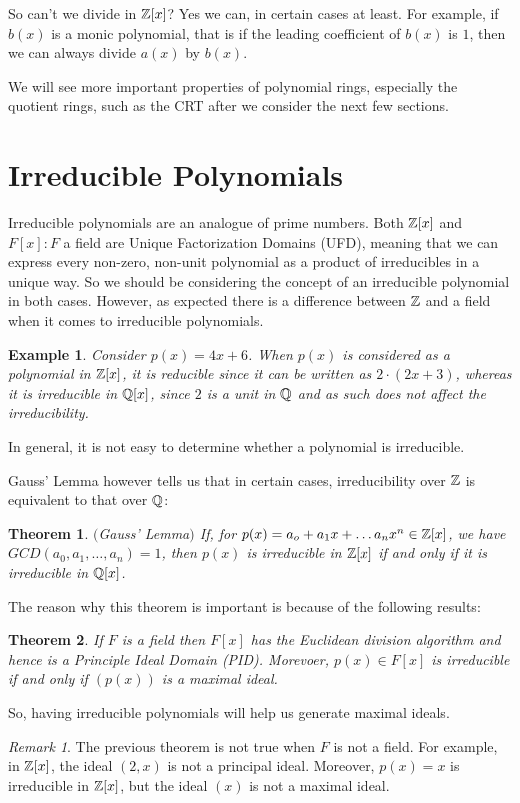 \documentclass[12pt]{article}
\theoremstyle{plain}
\newtheorem{example}{Example}
\newtheorem{theorem}{Theorem}
\theoremstyle{definition}
\theoremstyle{remark}
\newtheorem{remark}{Remark}
\begin{document}
So can't we divide in $\mathbb{Z}[x]$? Yes we can, in certain cases at least. For example, if $b(x)$ is a monic polynomial, that is if the leading coefficient of $b(x)$ is $1$, then we can always divide $a(x)$ by $b(x)$. 

We will see more important properties of polynomial rings, especially the quotient rings, such as the CRT after we consider the next few sections. 
\section{Irreducible Polynomials} Irreducible polynomials are an analogue of prime numbers. Both $\mathbb{Z}[x]$ and $F[x]: F$ a field are Unique Factorization Domains (UFD), meaning that we can express every non-zero, non-unit polynomial as a product of irreducibles in a unique way. So we should be considering the concept of an irreducible polynomial in both cases. However, as expected there is a difference between $\mathbb{Z}$ and a field when it comes to irreducible polynomials. 
\begin{example}
Consider $p(x)=4x+6$. When $p(x)$ is considered as a polynomial in $\mathbb{Z}[x]$, it is reducible since it can be written as $2\cdot (2x+3)$, whereas it is irreducible in $\mathbb{Q}[x]$, since $2$ is a unit in $\mathbb{Q}$ and as such does not affect the irreducibility. 
\end{example}
In general, it is not easy to determine whether a polynomial is irreducible. 

Gauss' Lemma however tells us that in certain cases, irreducibility over $\mathbb{Z}$ is equivalent to that over $\mathbb{Q}$:
\begin{theorem}$($Gauss' Lemma$)$
If, for $p(x)=a_o+a_1x+\dots a_nx^n \in \mathbb{Z}[x]$, we have 
$GCD(a_0, a_1, \dots, a_n)=1$, then $p(x)$ is irreducible in $\mathbb{Z}[x]$ if and only if it is irreducible in $\mathbb{Q}[x]$. 
\end{theorem}
The reason why this theorem is important is because of the following results:
\begin{theorem}\label{irmax}
If $F$ is a field then $F[x]$ has the Euclidean division algorithm and hence is a Principle Ideal Domain (PID). Morevoer, $p(x)\in F[x]$ is irreducible if and only if $(p(x))$ is a maximal ideal. 
\end{theorem}
So, having irreducible polynomials will help us generate maximal ideals. 
\begin{remark}
The previous theorem is not true when $F$ is not a field. For example, in $\mathbb{Z}[x]$, the ideal $(2,x)$ is not a principal ideal. Moreover, $p(x) = x$ is irreducible in $\mathbb{Z}[x]$, but the ideal $(x)$ is not a maximal ideal. 
\end{remark}
\end{document}
